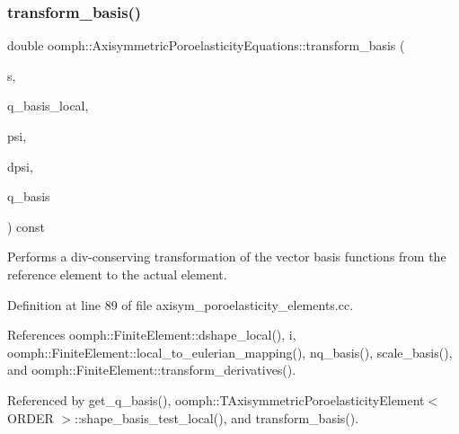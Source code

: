 \subsubsection{\texorpdfstring{transform\+\_\+basis()}{transform\_basis()}\hspace{0.1cm}{\footnotesize\ttfamily [1/2]}}
{\footnotesize\ttfamily double oomph\+::\+Axisymmetric\+Poroelasticity\+Equations\+::transform\+\_\+basis (\begin{DoxyParamCaption}\item[{const \hyperlink{classoomph_1_1Vector}{Vector}$<$ double $>$ \&}]{s,  }\item[{const \hyperlink{classoomph_1_1Shape}{Shape} \&}]{q\+\_\+basis\+\_\+local,  }\item[{\hyperlink{classoomph_1_1Shape}{Shape} \&}]{psi,  }\item[{\hyperlink{classoomph_1_1DShape}{D\+Shape} \&}]{dpsi,  }\item[{\hyperlink{classoomph_1_1Shape}{Shape} \&}]{q\+\_\+basis }\end{DoxyParamCaption}) const}



Performs a div-\/conserving transformation of the vector basis functions from the reference element to the actual element. 



Definition at line 89 of file axisym\+\_\+poroelasticity\+\_\+elements.\+cc.



References oomph\+::\+Finite\+Element\+::dshape\+\_\+local(), i, oomph\+::\+Finite\+Element\+::local\+\_\+to\+\_\+eulerian\+\_\+mapping(), nq\+\_\+basis(), scale\+\_\+basis(), and oomph\+::\+Finite\+Element\+::transform\+\_\+derivatives().



Referenced by get\+\_\+q\+\_\+basis(), oomph\+::\+T\+Axisymmetric\+Poroelasticity\+Element$<$ O\+R\+D\+E\+R $>$\+::shape\+\_\+basis\+\_\+test\+\_\+local(), and transform\+\_\+basis().

\mbox{\label{classoomph_1_1AxisymmetricPoroelasticityEquations_a1099fdce51f4b25e69e89a8b46c12a43}} 
